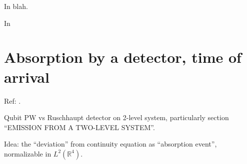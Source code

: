 In blah.

In \cite{Moreva:synthetic, Moreva:illustration}

\iftodo

\section{Absorption by a detector, time of arrival}
Ref: \cite{RuschhauptAbsorption}.

Qubit PW vs Ruschhaupt detector on 2-level system,
particularly section “EMISSION FROM A TWO-LEVEL SYSTEM”.

Idea: the ``deviation'' from continuity equation as ``absorption event'',
normalizable in $L^2(\mathbb{R}^4)$.

\fi

